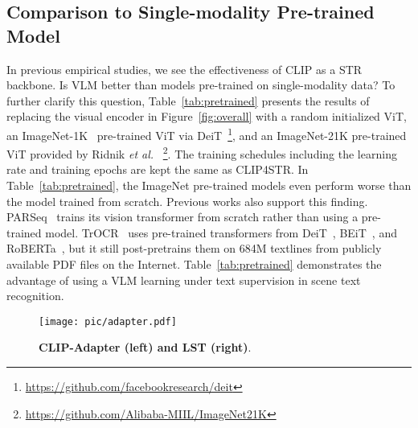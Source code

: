 \documentclass[lettersize,journal]{IEEEtran}
\begin{document}
\subsection{Comparison to Single-modality Pre-trained Model}

In previous empirical studies, we see the effectiveness of CLIP as a STR backbone.
Is VLM better than models pre-trained on single-modality data?
To further clarify this question, Table~\ref{tab:pretrained} presents the results of replacing the visual encoder in Figure~\ref{fig:overall} with a random initialized ViT,
an ImageNet-1K~\cite{2015_loga_imagenet} pre-trained ViT via DeiT~\cite{2021_hugo_deit}\footnote{\url{https://github.com/facebookresearch/deit}},
and an ImageNet-21K pre-trained ViT
provided by Ridnik \textit{et al.}~\cite{ridnik2021imagenet}
\footnote{\url{https://github.com/Alibaba-MIIL/ImageNet21K}}.
The training schedules including the learning rate and training epochs are kept the same as CLIP4STR.
In Table~\ref{tab:pretrained}, the ImageNet pre-trained models even perform worse than the model trained from scratch.
Previous works also support this finding.
PARSeq~\cite{2022_parseq} trains its vision transformer from scratch rather than using a pre-trained model.
TrOCR~\cite{li2021trocr} uses pre-trained transformers from DeiT~\cite{2021_hugo_deit}, BEiT~\cite{2022_bao_beit}, and RoBERTa~\cite{2019_roberta}, but it still post-pretrains them on 684M textlines from publicly available PDF files on the Internet.
Table~\ref{tab:pretrained} demonstrates the advantage of using a VLM learning under text supervision in scene text recognition.


\begin{figure}[t]
	\centering
	\texttt{[image: pic/adapter.pdf]}
	\caption{\textbf{CLIP-Adapter (left) and LST (right)}.}
	\label{fig:adapter}
\end{figure}
\end{document}
